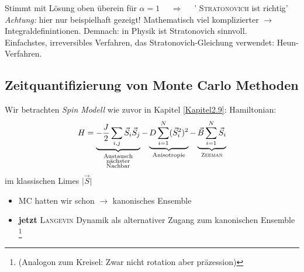 \documentclass[12pt]{article}
\begin{document}
Stimmt mit Lösung oben überein für $ \alpha = 1$ $ \quad \Rightarrow \quad $ ' \textsc{Stratonovich} ist richtig' \\
\textit{Achtung:} hier nur beispielhaft gezeigt! Mathematisch viel komplizierter $\to$ Integraldefinintionen. Demnach: in Physik ist Stratonovich sinnvoll. \\

Einfachstes, irreversibles Verfahren, das Stratonovich-Gleichung verwendet: Heun-Verfahren. 

\subsection{Zeitquantifizierung von Monte Carlo Methoden} %
 Wir betrachten  \textit{ Spin Modell }wie zuvor in Kapitel  \ref{Kapitel2.9}:
 Hamiltonian: \begin{align}
 H =\underbrace{ -\frac{J}{2} \sum_{i,j} \vec{S}_i \vec{S}_j }_{ \substack{ \text{Austausch} \\ \text{nächster} \\ \text{Nachbar}}}- \underbrace{ D \sum_{i=1}^N (\vec{S}_i^2)^2 }_\text{Anisotropie}- \underbrace{\vec{B} \sum_{i=1}^N \vec{S}_i }_\text{\textsc{Zeeman}}
 \end{align}
 im klassischen Limes $\vert \vec{S} \vert $ 
 \begin{itemize}
 \item MC hatten wir schon $\to$ kanonisches Ensemble
 \item \textbf{jetzt} \textsc{Langevin} Dynamik als alternativer Zugang zum kanonischen Ensemble \footnote{(Analogon zum Kreisel: Zwar nicht rotation aber präzession)}
  \end{itemize}
\end{document}
